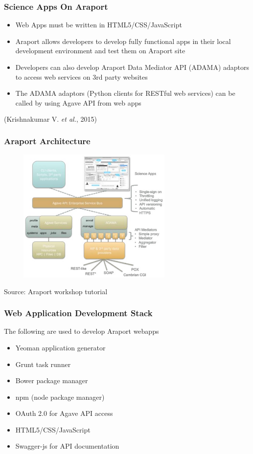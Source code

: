 \documentclass{beamer}
\begin{document}
	\begin{frame}
		\frametitle{Science Apps On Araport}
		\begin{itemize}
			\item Web Apps must be written in HTML5/CSS/JavaScript
			\item Araport allows developers to develop fully functional apps in their local development environment and test them on Araport site
			\item Developers can also develop Araport Data Mediator API (ADAMA) adaptors to access web services on 3rd party websites
			\item The ADAMA adaptors (Python clients for RESTful web services) can be called by using Agave API from web apps
		\end{itemize}
		(Krishnakumar V. \textit{et al.}, 2015)
	\end{frame}

	\begin{frame}
		\frametitle{Araport Architecture}
		\begin{figure}[!htb]
			\centering
			\includegraphics[width=3in]{Araport.eps}
		\end{figure}
		Source: Araport workshop tutorial
	\end{frame}

	\begin{frame}
		\frametitle{Web Application Development Stack}
		The following are used to develop Araport webapps
		\begin{itemize}
			\item Yeoman application generator
			\item Grunt task runner
			\item Bower package manager
			\item npm (node package manager)
			\item OAuth 2.0 for Agave API access
			\item HTML5/CSS/JavaScript
			\item Swagger-js for API documentation
		\end{itemize}
	\end{frame}
\end{document}
